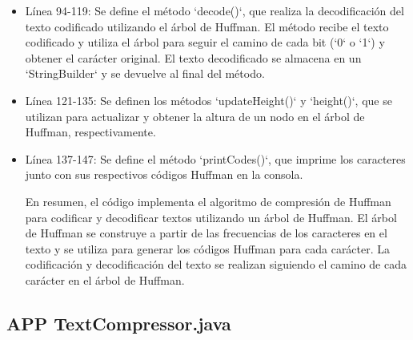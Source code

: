 \documentclass{article}
\begin{document}
\begin{itemize}
\item Línea 94-119: Se define el método `decode()`, que realiza la decodificación del texto codificado utilizando el árbol de Huffman. El método recibe el texto codificado y utiliza el árbol para seguir el camino de cada bit (`0` o `1`) y obtener el carácter original. El texto decodificado se almacena en un `StringBuilder` y se devuelve al final del método.

\item Línea 121-135: Se definen los métodos `updateHeight()` y `height()`, que se utilizan para actualizar y obtener la altura de un nodo en el árbol de Huffman, respectivamente.

\item Línea 137-147: Se define el método `printCodes()`, que imprime los caracteres junto con sus respectivos códigos Huffman en la consola.

En resumen, el código implementa el algoritmo de compresión de Huffman para codificar y decodificar textos utilizando un árbol de Huffman. El árbol de Huffman se construye a partir de las frecuencias de los caracteres en el texto y se utiliza para generar los códigos Huffman para cada carácter. La codificación y decodificación del texto se realizan siguiendo el camino de cada carácter en el árbol de Huffman.
\end{itemize}

\subsection{APP TextCompressor.java}
	
\end{document}
